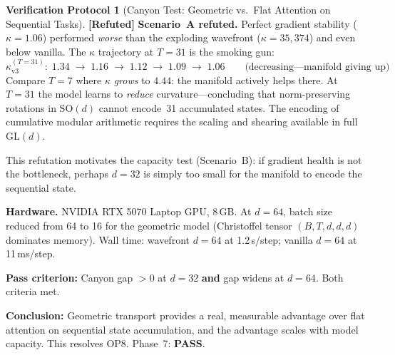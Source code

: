 \documentclass[11pt,a4paper]{article}
\theoremstyle{definition}
\newtheorem{protocol}[theorem]{Verification Protocol}
\theoremstyle{remark}
\newcommand{\SO}{\mathrm{SO}}
\newcommand{\statusrefuted}{\textcolor{red!90!black}{\textbf{[Refuted]}}}
\begin{document}
\begin{protocol}[Canyon Test: Geometric vs.\ Flat Attention on 
Sequential Tasks]
\statusrefuted{} \textbf{Scenario~A refuted.} Perfect gradient 
stability ($\kappa = 1.06$) performed \emph{worse} than the 
exploding wavefront ($\kappa = 35{,}374$) and even below vanilla. 
The $\kappa$ trajectory at $T = 31$ is the smoking gun:
\[
  \kappa_{\text{v3}}^{(T=31)}: \;
  1.34 \;\to\; 1.16 \;\to\; 1.12 \;\to\; 1.09 \;\to\; 1.06
  \qquad\text{(decreasing---manifold giving up)}
\]
Compare $T = 7$ where $\kappa$ \emph{grows} to $4.44$: the 
manifold actively helps there.  At $T = 31$ the model learns to 
\emph{reduce} curvature---concluding that norm-preserving 
rotations in $\SO(d)$ cannot encode~31 accumulated states.  
The encoding of cumulative modular arithmetic requires 
the scaling and shearing available in full $\mathrm{GL}(d)$.

This refutation motivates the capacity test (Scenario~B): if 
gradient health is not the bottleneck, perhaps $d = 32$ is simply 
too small for the manifold to encode the sequential state.

\textbf{Hardware.} NVIDIA RTX 5070 Laptop GPU, 8\,GB. At 
$d = 64$, batch size reduced from 64 to 16 for the geometric 
model (Christoffel tensor $(B, T, d, d, d)$ dominates memory). 
Wall time: wavefront $d{=}64$ at 1.2\,s/step; vanilla $d{=}64$ 
at 11\,ms/step.

\textbf{Pass criterion:} Canyon gap $> 0$ at $d = 32$ \textbf{and} 
gap widens at $d = 64$. Both criteria met.

\textbf{Conclusion:} Geometric transport provides a real, 
measurable advantage over flat attention on sequential state 
accumulation, and the advantage scales with model capacity. 
This resolves OP8. Phase~7: \textbf{PASS}.


\end{protocol}
\end{document}

